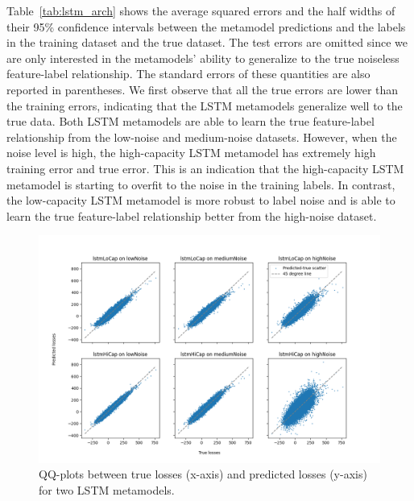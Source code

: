 \documentclass{article}
\begin{document}
Table~\ref{tab:lstm_arch} shows the average squared errors and the half widths of their 95\% confidence intervals between the metamodel predictions and the labels in the training dataset and the true dataset.
The test errors are omitted since we are only interested in the metamodels' ability to generalize to the true noiseless feature-label relationship.
The standard errors of these quantities are also reported in parentheses.
We first observe that all the true errors are lower than the training errors, indicating that the LSTM metamodels generalize well to the true data.
Both LSTM metamodels are able to learn the true feature-label relationship from the low-noise and medium-noise datasets.
However, when the noise level is high, the high-capacity LSTM metamodel has extremely high training error and true error.
This is an indication that the high-capacity LSTM metamodel is starting to overfit to the noise in the training labels.
In contrast, the low-capacity LSTM metamodel is more robust to label noise and is able to learn the true feature-label relationship better from the high-noise dataset.

\begin{figure}[ht!]
    \centering
    \includegraphics[width=\textwidth]{./figures/qqPlots/lstmAll.png}
    \caption{QQ-plots between true losses (x-axis) and predicted losses (y-axis) for two LSTM metamodels.} 
    \label{fig:QQ_All}
\end{figure}
\end{document}
